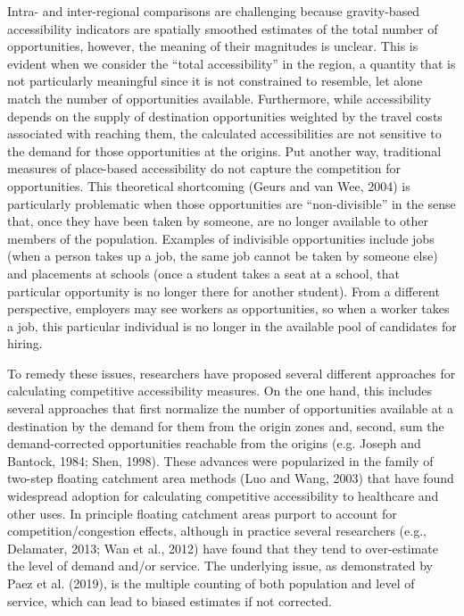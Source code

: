 \documentclass[]{elsarticle} %
\begin{document}
Intra- and inter-regional comparisons are challenging because
gravity-based accessibility indicators are spatially smoothed estimates
of the total number of opportunities, however, the meaning of their
magnitudes is unclear. This is evident when we consider the ``total
accessibility'' in the region, a quantity that is not particularly
meaningful since it is not constrained to resemble, let alone match the
number of opportunities available. Furthermore, while accessibility
depends on the supply of destination opportunities weighted by the
travel costs associated with reaching them, the calculated
accessibilities are not sensitive to the demand for those opportunities
at the origins. Put another way, traditional measures of place-based
accessibility do not capture the competition for opportunities. This
theoretical shortcoming (Geurs and van Wee, 2004) is particularly
problematic when those opportunities are ``non-divisible'' in the sense
that, once they have been taken by someone, are no longer available to
other members of the population. Examples of indivisible opportunities
include jobs (when a person takes up a job, the same job cannot be taken
by someone else) and placements at schools (once a student takes a seat
at a school, that particular opportunity is no longer there for another
student). From a different perspective, employers may see workers as
opportunities, so when a worker takes a job, this particular individual
is no longer in the available pool of candidates for hiring.

To remedy these issues, researchers have proposed several different
approaches for calculating competitive accessibility measures. On the
one hand, this includes several approaches that first normalize the
number of opportunities available at a destination by the demand for
them from the origin zones and, second, sum the demand-corrected
opportunities reachable from the origins (e.g. Joseph and Bantock, 1984;
Shen, 1998). These advances were popularized in the family of two-step
floating catchment area methods (Luo and Wang, 2003) that have found
widespread adoption for calculating competitive accessibility to
healthcare and other uses. In principle floating catchment areas purport
to account for competition/congestion effects, although in practice
several researchers (e.g., Delamater, 2013; Wan et al., 2012) have found
that they tend to over-estimate the level of demand and/or service. The
underlying issue, as demonstrated by Paez et al. (2019), is the multiple
counting of both population and level of service, which can lead to
biased estimates if not corrected.
\end{document}
